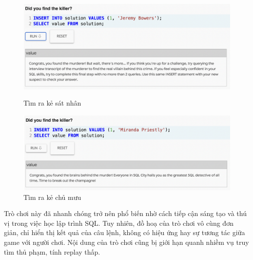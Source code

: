 \begin{figure}[H]
\centering
\begin{minipage}{.5\textwidth}
  \centering
  \includegraphics[width=0.75\linewidth]{Images/smm_killer.png}
  \vspace{0.5cm}
  \caption{Tìm ra kẻ sát nhân}
  \label{fig:test1}
\end{minipage}%
\begin{minipage}{.5\textwidth}
  \centering
  \includegraphics[width=.75\linewidth]{Images/smm_boss.png}
  \vspace{0.5cm}
  \caption{Tìm ra kẻ chủ mưu}
  \label{fig:test2}
\end{minipage}
\end{figure}
\hspace*{0.5cm} Trò chơi này đã nhanh chóng trở nên phổ biến nhờ cách tiếp cận sáng tạo và thú vị trong việc học lập trình SQL. Tuy nhiên, đồ hoạ của trò chơi vô cùng đơn giản, chỉ hiển thị kết quả của câu lệnh, không có hiệu ứng hay sự tương tác giữa game với người chơi. Nội dung của trò chơi cũng bị giới hạn quanh nhiềm vụ truy tìm thủ phạm, tính replay thấp.
